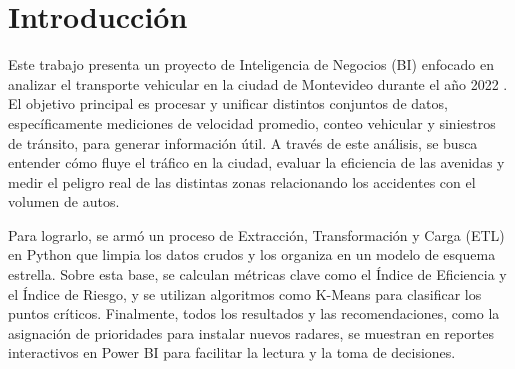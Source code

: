 \section{Introducci\'on}

Este trabajo presenta un proyecto de Inteligencia de Negocios (BI) enfocado en 
analizar el transporte vehicular en la ciudad de Montevideo durante el año 2022
. El objetivo principal es procesar y unificar distintos conjuntos de datos, 
específicamente mediciones de velocidad promedio, conteo vehicular y 
siniestros de tránsito, para generar información útil. A través de este 
análisis, se busca entender cómo fluye el tráfico en la ciudad, evaluar la 
eficiencia de las avenidas y medir el peligro real de las distintas zonas 
relacionando los accidentes con el volumen de autos.

Para lograrlo, se armó un proceso de Extracción, Transformación y Carga (ETL) 
en Python que limpia los datos crudos y los organiza en un modelo de esquema 
estrella. Sobre esta base, se calculan métricas clave como el Índice de 
Eficiencia y el Índice de Riesgo, y se utilizan algoritmos como K-Means para 
clasificar los puntos críticos. Finalmente, todos los resultados y las 
recomendaciones, como la asignación de prioridades para instalar nuevos radares,
se muestran en reportes interactivos en Power BI para facilitar la lectura y 
la toma de decisiones. 




